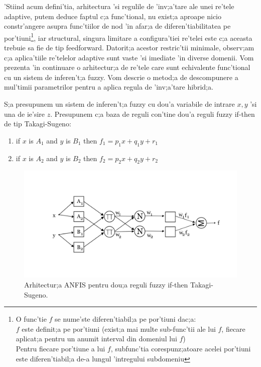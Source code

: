 'Stiind acum defini'tia, arhitectura 'si regulile de 'inv;a'tare ale unei re'tele adaptive, putem deduce faptul c;a func'tional, nu exist;a aproape nicio constr'angere asupra func'tiilor de nod 'in afar;a de diferen'tiabilitatea pe por'tiuni\footnote{O func'tie $f$ se nume'ste diferen'tiabil;a pe por'tiuni dac;a: \\
$f$ este definit;a pe por'tiuni (exist;a mai multe sub-func'tii ale lui $f$, fiecare aplicat;a pentru un anumit interval din domeniul lui $f$) \\
Pentru fiecare por'tiune a lui $f$, subfunc'tia corespunz;atoare acelei por'tiuni este diferen'tiabil;a de-a lungul 'intregului subdomeniu}, iar structural, singura limitare a configura'tiei re'telei este c;a aceasta trebuie sa fie de tip feedforward. Datorit;a acestor restric'tii minimale, observ;am c;a aplica'tiile re'telelor adaptive sunt vaste 'si imediate 'in diverse domenii. Vom prezenta 'in continuare o arhitectur;a de re'tele care sunt echivalente func'tional cu un sistem de inferen't;a fuzzy. Vom descrie o metod;a de descompunere a mul'timii parametrilor pentru a aplica regula de 'inv;a'tare hibrid;a.
\par
S;a presupunem un sistem de inferen't;a fuzzy cu dou'a variabile de intrare $x, y$ 'si una de ie'sire $z$. Presupunem c;a baza de reguli con'tine dou'a reguli fuzzy if-then de tip Takagi-Sugeno:
\begin{enumerate}
\item if $x$ is $A_{1}$ and $y$ is $B_{1}$ then $f_{1} = p_{1}x + q_{1}y + r_{1}$
\item if $x$ is $A_{2}$ and $y$ is $B_{2}$ then $f_{2} = p_{2}x + q_{2}y + r_{2}$
\end{enumerate}
\begin{figure}[!htbp]
\includegraphics[width=\textwidth]{anfisarch}
\caption{Arhitectur;a ANFIS pentru dou;a reguli fuzzy if-then Takagi-Sugeno.}
\end{figure}
\newpage
